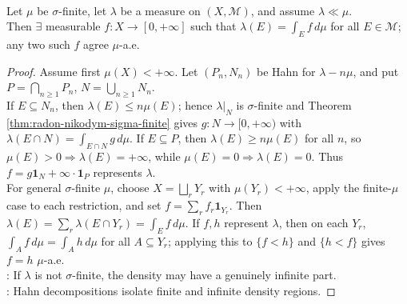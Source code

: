 \begin{theorem} \label{thm:radon-nikodym-extended-dominated-measure} \\
Let $\mu$ be $\sigma$-finite, let $\lambda$ be a measure on $(X,\mathcal{M})$, and assume $\lambda\ll\mu$.\\
Then $\exists$ measurable $f:X\to[0,+\infty]$ such that $\lambda(E)=\int_Ef\,d\mu$ for all $E\in\mathcal{M}$; any two such $f$ agree $\mu$-a.e.
\begin{proof}
Assume first $\mu(X)<+\infty$. Let $(P_n,N_n)$ be Hahn for $\lambda-n\mu$, and put $P=\bigcap_{n\geq1}P_n$, $N=\bigcup_{n\geq1}N_n$.\\
If $E\subseteq N_n$, then $\lambda(E)\leq n\mu(E)$; hence $\lambda|_N$ is $\sigma$-finite and Theorem \ref{thm:radon-nikodym-sigma-finite} gives $g:N\to[0,+\infty)$ with $\lambda(E\cap N)=\int_{E\cap N}g\,d\mu$. If $E\subseteq P$, then $\lambda(E)\geq n\mu(E)$ for all $n$, so $\mu(E)>0\Rightarrow\lambda(E)=+\infty$, while $\mu(E)=0\Rightarrow\lambda(E)=0$. Thus $f=g\mathbf{1}_N+\infty\cdot\mathbf{1}_P$ represents $\lambda$.\\
For general $\sigma$-finite $\mu$, choose $X=\bigsqcup_rY_r$ with $\mu(Y_r)<+\infty$, apply the finite-$\mu$ case to each restriction, and set $f=\sum_rf_r\mathbf{1}_{Y_r}$. Then $\lambda(E)=\sum_r\lambda(E\cap Y_r)=\int_Ef\,d\mu$. If $f,h$ represent $\lambda$, then on each $Y_r$, $\int_Af\,d\mu=\int_Ah\,d\mu$ for all $A\subseteq Y_r$; applying this to $\{f<h\}$ and $\{h<f\}$ gives $f=h$ $\mu$-a.e.\\
: If $\lambda$ is not $\sigma$-finite, the density may have a genuinely infinite part.\\
: Hahn decompositions isolate finite and infinite density regions.
\end{proof}
\end{theorem}

